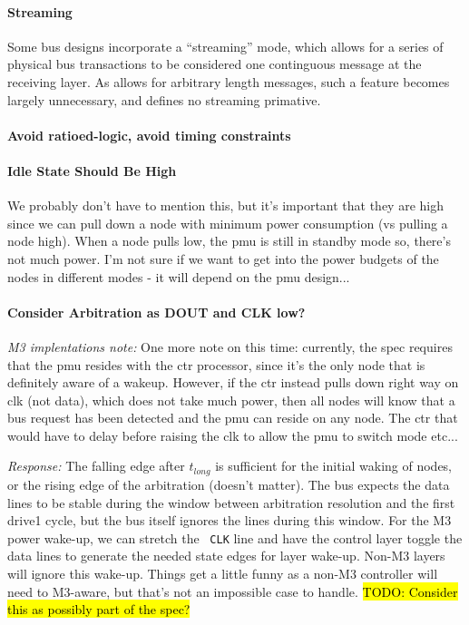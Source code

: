 \paragraph{Streaming}
Some bus designs incorporate a ``streaming'' mode, which allows for a series
of physical bus transactions to be considered one continguous message at the
receiving layer. As \bus allows for arbitrary length messages, such a feature
becomes largely unnecessary, and \bus defines no streaming primative.

\paragraph{Avoid ratioed-logic, avoid timing constraints}

\paragraph{Idle State Should Be High}
We probably don't have to mention this, but it's important that they are high
since we can pull down a node with minimum power consumption (vs pulling a
node high). When a node pulls low, the pmu is still in standby mode so,
there's not much power.  I'm not sure if we want to get into the power budgets
of the nodes in different modes - it will depend on the pmu design...

\paragraph{Consider Arbitration as DOUT and CLK low?}
\label{todo:wakeup}
{\em M3 implentations note:} One more note on this time: currently, the spec
requires that the pmu resides with the ctr processor, since it's the only node
that is definitely aware of a wakeup.  However, if the ctr instead pulls down
right way on clk (not data), which does not take much power, then all nodes
will know that a bus request has been detected and the pmu can reside on any
node.  The ctr that would have to delay before raising the clk to allow the
pmu to switch mode etc...

{\em Response:} The falling edge after $t_{long}$ is sufficient for the
initial waking of nodes, or the rising edge of the arbitration (doesn't
matter). The bus expects the data lines to be stable during the window between
arbitration resolution and the first {\sc drive1} cycle, but the bus itself
ignores the lines during this window. For the M3 power wake-up, we can stretch
the \bus~{\tt CLK} line and have the control layer toggle the data lines to
generate the needed state edges for layer wake-up. Non-M3 layers will ignore
this wake-up. Things get a little funny as a non-M3 controller will need to
M3-aware, but that's not an impossible case to handle. \hl{TODO: Consider this
as possibly part of the spec?}

